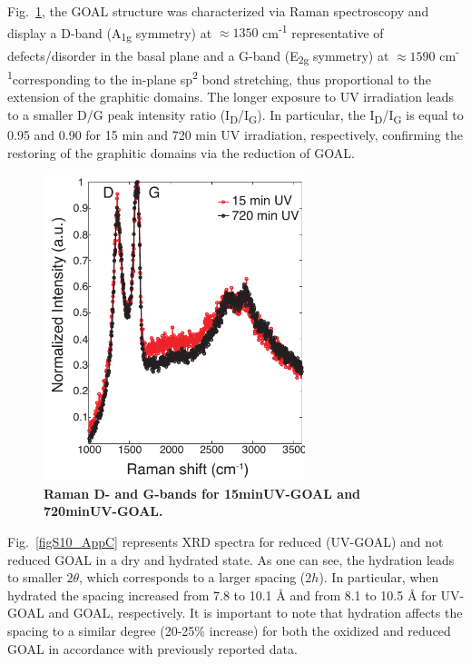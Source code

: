 Fig.~\ref{figS9_AppC}, the GOAL structure was characterized via Raman spectroscopy and display a D-band (A\textsubscript{1g }symmetry) at $\approx1350$ cm\textsuperscript{-1} representative of defects/disorder in the basal plane and a
G-band (E\textsubscript{2g} symmetry) at $\approx1590$ cm\textsuperscript{-1}corresponding to the in-plane sp\textsuperscript{2} bond stretching, thus proportional to the extension of the graphitic domains. The longer exposure to UV irradiation leads to a smaller D/G peak intensity ratio (I\textsubscript{D}/I\textsubscript{G}). In particular, the I\textsubscript{D}/I\textsubscript{G} is equal to 0.95 and 0.90 for 15 min and 720 min UV irradiation, respectively, confirming the restoring of the graphitic domains via the reduction of GOAL. 
\begin{figure}[h!]
  \centering
  \includegraphics[width=3in]{paper4/FigS9.pdf}
  \caption{\textbf{ Raman D- and G-bands for 15minUV-GOAL and 720minUV-GOAL.}} 
  \label{figS9_AppC}
\end{figure}

Fig.~\ref{figS10_AppC} represents XRD spectra for reduced (UV-GOAL) and not reduced GOAL in a dry and hydrated state. As one can see, the hydration leads to smaller $2\theta$, which corresponds to a larger spacing ($2h$). In particular, when hydrated the spacing increased from 7.8 to 10.1 {\AA} and
from 8.1 to 10.5 {\AA} for UV-GOAL and GOAL, respectively. It is important to note that hydration affects the spacing to a similar degree (20-25\% increase) for both the oxidized and reduced GOAL in accordance with previously reported data.\cite{talyzin2014structure}

